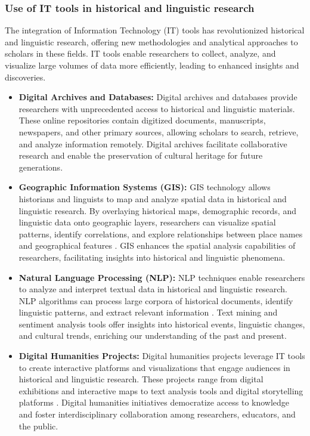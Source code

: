 \subsubsection{Use of IT tools in historical and linguistic research}
The integration of Information Technology (IT) tools has revolutionized historical and linguistic research, offering new methodologies and analytical approaches to scholars in these fields. IT tools enable researchers to collect, analyze, and visualize large volumes of data more efficiently, leading to enhanced insights and discoveries.
\begin{itemize}
    \item \textbf{Digital Archives and Databases:}
    Digital archives and databases provide researchers with unprecedented access to historical and linguistic materials. These online repositories contain digitized documents, manuscripts, newspapers, and other primary sources, allowing scholars to search, retrieve, and analyze information remotely. Digital archives facilitate collaborative research and enable the preservation of cultural heritage for future generations.
		\item \textbf{Geographic Information Systems (GIS):}
		GIS technology allows historians and linguists to map and analyze spatial data in historical and linguistic research. By overlaying historical maps, demographic records, and linguistic data onto geographic layers, researchers can visualize spatial patterns, identify correlations, and explore relationships between place names and geographical features \cite{Bolstad}. GIS enhances the spatial analysis capabilities of researchers, facilitating insights into historical and linguistic phenomena.
		\item \textbf{Natural Language Processing (NLP):}
		NLP techniques enable researchers to analyze and interpret textual data in historical and linguistic research. NLP algorithms can process large corpora of historical documents, identify linguistic patterns, and extract relevant information \cite{Bird}. Text mining and sentiment analysis tools offer insights into historical events, linguistic changes, and cultural trends, enriching our understanding of the past and present.
		\item \textbf{Digital Humanities Projects:}
		Digital humanities projects leverage IT tools to create interactive platforms and visualizations that engage audiences in historical and linguistic research. These projects range from digital exhibitions and interactive maps to text analysis tools and digital storytelling platforms \cite{Bolstad}. Digital humanities initiatives democratize access to knowledge and foster interdisciplinary collaboration among researchers, educators, and the public.

\end{itemize}
